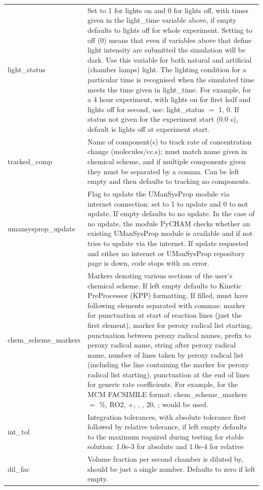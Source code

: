 \documentclass[gmd, manuscript]{copernicus}
\begin{document}
\begin{center}
\begin{supertabular}{p{0.15\textwidth}p{0.75\textwidth}}
light\_status & Set to 1 for lights on and 0 for lights off, with times given in the light\_time variable above, if empty defaults to lights off for whole experiment.  Setting to off (0) means that even if variables above that define light intensity are submitted the simulation will be dark.  Use this variable for both natural and artificial (chamber lamps) light.  The lighting condition for a particular time is recognised when the simulated time meets the time given in light\_time.  For example, for a 4 hour experiment, with lights on for first half and lights off for second, use: light\_status $=$ 1, 0.  If status not given for the experiment start (0.0 s), default is lights off at experiment start.\\

tracked\_comp & Name of component(s) to track rate of concentration change (molecules/cc.s); must match name given in chemical scheme, and if multiple components given they must be separated by a comma.  Can be left empty and then defaults to tracking no components.\\	

umansysprop\_update & Flag to update the UManSysProp module via internet connection: set to 1 to update and 0 to not update.  If empty defaults to no update.  In the case of no update, the module PyCHAM checks whether an existing UManSysProp module is available and if not tries to update via the internet.  If update requested and either no internet or UManSysProp repository page is down, code stops with an error.\\

chem\_scheme\_markers & Markers denoting various sections of the user's chemical scheme.  If left empty defaults to Kinetic PreProcessor (KPP) formatting.  If filled, must have following elements separated with commas: marker for punctuation at start of reaction lines (just the first element), marker for peroxy radical list starting, punctuation between peroxy radical names, prefix to peroxy radical name, string after peroxy radical name, number of lines taken by peroxy radical list (including the line containing the marker for peroxy radical list starting), punctuation at the end of lines for generic rate coefficients.  For example, for the MCM FACSIMILE format: chem\_scheme\_markers $=$ \%, RO2, +, , , 20, ; would be used.\\

int\_tol & Integration tolerances, with absolute tolerance first followed by relative tolerance, if left empty defaults to the maximum required during testing for stable solution: 1.0e-3 for absolute and 1.0e-4 for relative\\

dil\_fac & Volume fraction per second chamber is diluted by, should be just a single number.  Defaults to zero if left empty.\\

\end{supertabular}
\end{center}
\end{document}
